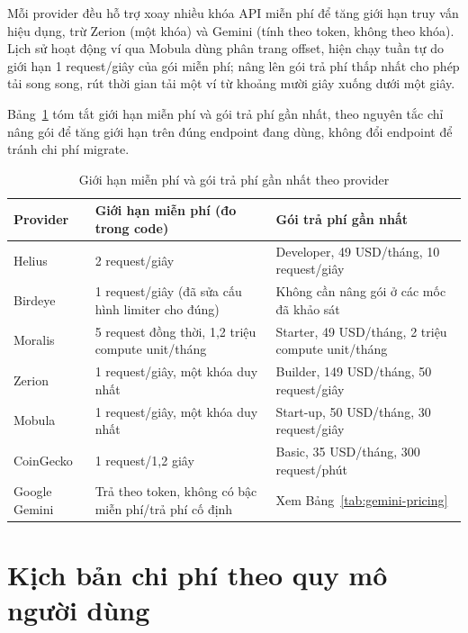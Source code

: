 Mỗi provider đều hỗ trợ xoay nhiều khóa API miễn phí để tăng giới hạn truy vấn hiệu dụng, trừ Zerion (một khóa) và Gemini (tính theo token, không theo khóa). Lịch sử hoạt động ví qua Mobula dùng phân trang offset, hiện chạy tuần tự do giới hạn 1 request/giây của gói miễn phí; nâng lên gói trả phí thấp nhất cho phép tải song song, rút thời gian tải một ví từ khoảng mười giây xuống dưới một giây.

Bảng~\ref{tab:provider-leverage} tóm tắt giới hạn miễn phí và gói trả phí gần nhất, theo nguyên tắc chỉ nâng gói để tăng giới hạn trên đúng endpoint đang dùng, không đổi endpoint để tránh chi phí migrate.

\begin{table}[H]
\centering
\small
\caption{Giới hạn miễn phí và gói trả phí gần nhất theo provider}
\label{tab:provider-leverage}
\begin{tabularx}{\textwidth}{|p{2.2cm}|X|X|}
\hline
\textbf{Provider} & \textbf{Giới hạn miễn phí (đo trong code)} & \textbf{Gói trả phí gần nhất} \\
\hline
Helius & 2 request/giây & Developer, 49 USD/tháng, 10 request/giây \cite{helius-pricing} \\
\hline
Birdeye & 1 request/giây (đã sửa cấu hình limiter cho đúng) & Không cần nâng gói ở các mốc đã khảo sát \cite{birdeye-pricing, birdeye-data-accessibility} \\
\hline
Moralis & 5 request đồng thời, 1,2 triệu compute unit/tháng & Starter, 49 USD/tháng, 2 triệu compute unit/tháng \cite{moralis-pricing} \\
\hline
Zerion & 1 request/giây, một khóa duy nhất & Builder, 149 USD/tháng, 50 request/giây \cite{zerion-api} \\
\hline
Mobula & 1 request/giây, một khóa duy nhất & Start-up, 50 USD/tháng, 30 request/giây \cite{mobula-pricing} \\
\hline
CoinGecko & 1 request/1,2 giây & Basic, 35 USD/tháng, 300 request/phút \cite{coingecko-pricing} \\
\hline
Google Gemini & Trả theo token, không có bậc miễn phí/trả phí cố định & Xem Bảng~\ref{tab:gemini-pricing} \cite{gemini-pricing} \\
\hline
\end{tabularx}
\end{table}

\section{Kịch bản chi phí theo quy mô người dùng}

